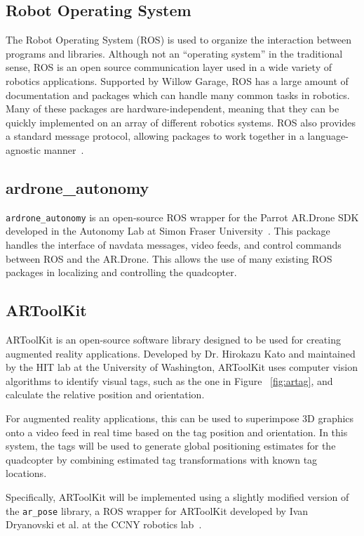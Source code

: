     \subsection{Robot Operating System}
         The Robot Operating System (ROS) is used to organize the interaction between programs and libraries. Although not an ``operating system'' in the traditional sense, ROS is an open source communication layer used in a wide variety of robotics applications. Supported by Willow Garage, ROS has a large amount of documentation and packages which can handle many common tasks in robotics. Many of these packages are hardware-independent, meaning that they can be quickly implemented on an array of different robotics systems. ROS also provides a standard message protocol, allowing packages to work together in a language-agnostic manner~\cite{ROS}.

    \subsection{ardrone\_autonomy}
        \texttt{ardrone\_autonomy} is an open-source ROS wrapper for the Parrot AR.Drone SDK developed in the Autonomy Lab at Simon Fraser University~\cite{Autonomy}. This package handles the interface of navdata messages, video feeds, and control commands between ROS and the AR.Drone. This allows the use of many existing ROS packages in localizing and controlling the quadcopter.

    \subsection{ARToolKit}
        ARToolKit is an open-source software library designed to be used for creating augmented reality applications. Developed by Dr. Hirokazu Kato and maintained by the HIT lab at the University of Washington, ARToolKit uses computer vision algorithms to identify visual tags, such as the one in Figure ~\ref{fig:artag}, and calculate the relative position and orientation. 

        For augmented reality applications, this can be used to superimpose 3D graphics onto a video feed in real time based on the tag position and orientation. In this system, the tags will be used to generate global positioning estimates for the quadcopter by combining estimated tag transformations with known tag locations.

        Specifically, ARToolKit will be implemented using a slightly modified version of the \texttt{ar\_pose} library, a ROS wrapper for ARToolKit developed by Ivan Dryanovski et al. at the CCNY robotics lab~\cite{arpose}.

